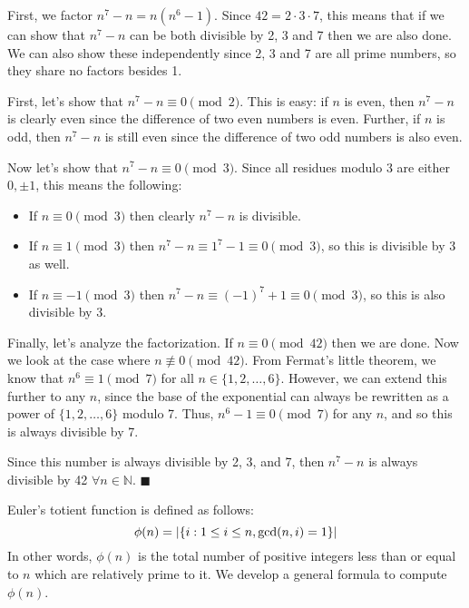 \documentclass[11pt]{article}
\begin{document}
\begin{solution}
  First, we factor $n^7 - n = n(n^6 - 1)$. Since $42 = 2 \cdot 3 \cdot 7$, this means that if we can show that $n^7 - n$ can be both divisible by 2, 3 and 7 then we are also done. We can also show these independently since 2, 3 and 7 are all prime numbers, so they share no factors besides 1. 

  First, let's show that $n^7 - n \equiv 0 \pmod{2}$. This is easy: if $n$ is even, then $n^7 - n$ is clearly even since the difference of two even numbers is even. Further, if $n$ is odd, then $n^7 - n$ is still even since the difference of two odd numbers is also even.

  Now let's show that $n^7 - n \equiv 0 \pmod{3}$. Since all residues modulo 3 are either $0, \pm 1$, this means the following: 

  \begin{itemize}
    \item If $n \equiv 0 \pmod{3}$ then clearly $n^7 - n$ is divisible. 
    \item If $n \equiv 1 \pmod{3}$ then $n^7 - n \equiv 1^7 - 1 \equiv 0 \pmod{3}$, so this is divisible by 3 as well.
    \item If $n \equiv -1 \pmod{3}$ then $n^7 - n \equiv (-1)^7 + 1 \equiv 0 \pmod{3}$, so this is also divisible by 3.
  \end{itemize}

  Finally, let's analyze the factorization. If $n \equiv 0 \pmod {42}$ then we are done. Now we look at the case where $n \not\equiv 0 \pmod{42}$. From Fermat's little theorem, we know that $n^6 \equiv 1 \pmod {7}$ for all $n \in \{1, 2, \dots, 6\}$. However, we can extend this further to any $n$, since the base of the exponential can always be rewritten as a power of $\{1, 2, \dots, 6\}$ modulo 7. Thus, $n^6 -1 \equiv 0 \pmod{7}$ for any $n$, and so this is always divisible by 7.  

  Since this number is always divisible by 2, 3, and 7, then $n^7 - n$ is always divisible by 42 $\forall n \in \mathbb N$. $\blacksquare$
\end{solution}
\pagebreak
{} 

  Euler's totient function is defined as follows:
  \[ \phi(n) = \left\lvert \{i: 1 \leq i \leq n, \gcd(n,i) = 1\} \right\rvert\]
  In other words, $\phi(n)$ is the total number of positive integers less than or equal to $n$ which are relatively prime to it. We develop a general formula to compute $\phi(n)$.
\end{document}
